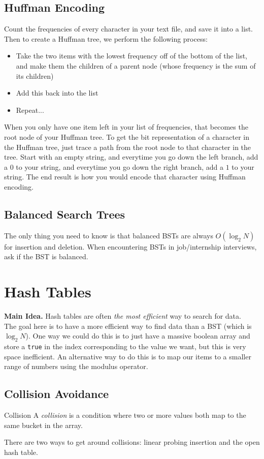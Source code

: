 \documentclass[class=article, crop=false]{standalone}
\begin{document}
  \subsection{Huffman Encoding}
  Count the frequencies of every character in your text file, and save it into a list. Then to create a Huffman tree, we perform the following process:
  \begin{itemize}
    \item Take the two items with the lowest frequency off of the bottom of the list, and make them the children of a parent node (whose frequency is the sum of its children)
    \item Add this back into the list
    \item Repeat...
  \end{itemize}
  When you only have one item left in your list of frequencies, that becomes the root node of your Huffman tree. To get the bit representation of a character in the Huffman tree, just trace a path from the root node to that character in the tree. Start with an empty string, and everytime you go down the left branch, add a $0$ to your string, and everytime you go down the right branch, add a $1$ to your string. The end result is how you would encode that character using Huffman encoding.
  \subsection{Balanced Search Trees}
  The only thing you need to know is that balanced BSTs are always $O(\log_2N)$ for insertion and deletion. When encountering BSTs in job/internship interviews, ask if the BST is balanced.
  \section{Hash Tables}
  \textbf{Main Idea.} Hash tables are often \emph{the most efficient} way to search for data. \\
  The goal here is to have a more efficient way to find data than a BST (which is $\log_2N$). One way we could do this is to just have a massive boolean array and store a \texttt{true} in the index corresponding to the value we want, but this is very space inefficient. An alternative way to do this is to map our items to a smaller range of numbers using the modulus operator.
  \subsection{Collision Avoidance}
  \begin{definition}{Collision}
    A \emph{collision} is a condition where two or more values both map to the same bucket in the array.
  \end{definition}
  There are two ways to get around collisions: linear probing insertion and the open hash table.
\end{document}
